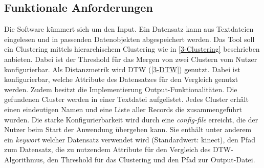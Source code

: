 \subsection{Funktionale Anforderungen}
\label{4-FunktionaleAnforderungen}
Die Software kümmert sich um den Input.
Ein Datensatz kann aus Textdateien eingelesen und in passenden Datenobjekten abgespeichert werden.
Das Tool soll ein Clustering mittels hierarchischem Clustering wie in \autoref{3-Clustering} beschrieben anbieten.
Dabei ist der Threshold für das Mergen von zwei Clustern vom Nutzer konfigurierbar.
Als Distanzmetrik wird \ac{DTW} (\autoref{3-DTW}) genutzt.
Dabei ist konfigurierbar, welche Attribute des Datensatzes für den Vergleich genutzt werden.
Zudem besitzt die Implementierung Output-Funktionalitäten.
Die gefundenen Cluster werden in einer Textdatei aufgelistet.
Jedes Cluster erhält einen eindeutigen Namen und eine Liste aller Records die zusammengeführt wurden.
Die starke Konfigurierbarkeit wird durch eine \emph{config-file} erreicht,
die der Nutzer beim Start der Anwendung übergeben kann.
Sie enthält unter anderem ein \emph{keywort} welcher Datensatz verwendet wird (Standardwert: \glqq kinect\grqq),
den Pfad zum Datensatz, die zu nutzendem Attribute für den Vergleich des \ac{DTW}-Algorithmus,
den Threshold für das Clustering und den Pfad zur Output-Datei.

